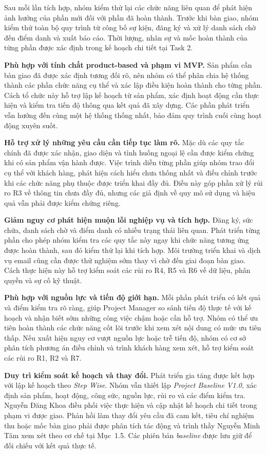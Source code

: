 Sau mỗi lần tích hợp, nhóm kiểm thử lại các chức năng liên quan để phát hiện ảnh hưởng của phần mới đối với phần đã hoàn thành. Trước khi bàn giao, nhóm kiểm thử toàn bộ quy trình từ công bố sự kiện, đăng ký và xử lý danh sách chờ đến điểm danh và xuất báo cáo. Thời lượng, nhân sự và mốc hoàn thành của từng phần được xác định trong kế hoạch chi tiết tại Task 2.


\textbf{Phù hợp với tính chất product-based và phạm vi MVP.} Sản phẩm cần bàn giao đã được xác định tương đối rõ, nên nhóm có thể phân chia hệ thống thành các phần chức năng cụ thể và xác lập điều kiện hoàn thành cho từng phần. Cách tổ chức này hỗ trợ lập kế hoạch từ sản phẩm, xác định hoạt động cần thực hiện và kiểm tra tiến độ thông qua kết quả đã xây dựng. Các phần phát triển vẫn hướng đến cùng một hệ thống thống nhất, bảo đảm quy trình cuối cùng hoạt động xuyên suốt.

\textbf{Hỗ trợ xử lý những yêu cầu cần tiếp tục làm rõ.} Mặc dù các quy tắc chính đã được xác nhận, giao diện và tình huống ngoại lệ cần được kiểm chứng khi có sản phẩm vận hành được. Việc trình diễn từng phần giúp nhóm trao đổi cụ thể với khách hàng, phát hiện cách hiểu chưa thống nhất và điều chỉnh trước khi các chức năng phụ thuộc được triển khai đầy đủ. Điều này góp phần xử lý rủi ro R3 về thông tin chưa đầy đủ, nhưng các giả định về quy mô sử dụng và hiệu quả vẫn phải được kiểm chứng riêng.

\textbf{Giảm nguy cơ phát hiện muộn lỗi nghiệp vụ và tích hợp.} Đăng ký, sức chứa, danh sách chờ và điểm danh có nhiều trạng thái liên quan. Phát triển từng phần cho phép nhóm kiểm tra các quy tắc này ngay khi chức năng tương ứng được hoàn thành, sau đó kiểm thử lại khi tích hợp. Môi trường triển khai và dịch vụ email cũng cần được thử nghiệm sớm thay vì chờ đến giai đoạn bàn giao. Cách thực hiện này hỗ trợ kiểm soát các rủi ro R4, R5 và R6 về dữ liệu, phân quyền và sự cố kỹ thuật.

\textbf{Phù hợp với nguồn lực và tiến độ giới hạn.} Mỗi phần phát triển có kết quả và điểm kiểm tra rõ ràng, giúp Project Manager so sánh tiến độ thực tế với kế hoạch và nhận biết sớm những công việc chậm hoặc cần hỗ trợ. Nhóm có thể ưu tiên hoàn thành các chức năng cốt lõi trước khi xem xét nội dung có mức ưu tiên thấp. Nếu xuất hiện nguy cơ vượt nguồn lực hoặc trễ tiến độ, nhóm có cơ sở phân tích phương án điều chỉnh và trình khách hàng xem xét, hỗ trợ kiểm soát các rủi ro R1, R2 và R7.

\textbf{Duy trì kiểm soát kế hoạch và thay đổi.} Phát triển gia tăng được kết hợp với lập kế hoạch theo \textit{Step Wise}. Nhóm vẫn thiết lập \textit{Project Baseline V1.0}, xác định sản phẩm, hoạt động, công sức, nguồn lực, rủi ro và các điểm kiểm tra. Nguyễn Đăng Khoa điều phối việc thực hiện và cập nhật kế hoạch chi tiết trong phạm vi được giao. Phản hồi làm thay đổi yêu cầu đã cam kết, tiêu chí nghiệm thu hoặc mốc bàn giao phải được phân tích tác động và trình thầy Nguyễn Minh Tâm xem xét theo cơ chế tại Mục~1.5. Các phiên bản \textit{baseline} được lưu giữ để đối chiếu với kết quả thực tế.